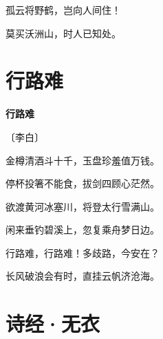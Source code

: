 \documentclass[12pt,UTF-8,openany,fontset=none]{ctexbook}
\begin{document}
    \vspace{18pt}

\begin{center}
    \begin{Large}

        孤云将野鹤，岂向人间住！

        莫买沃洲山，时人已知处。

    \end{Large}

\end{center}

\vspace{8pt}
\clearpage

\section{行路难}


\begin{center}
    {\bfseries 行路难}

    \vspace{18pt}

    \begin{large}\xuwen
        〔李白〕
    \end{large}

\end{center}

    \vspace{18pt}

\begin{center}
    \begin{Large}

        金樽清酒斗十千，玉盘珍羞值万钱。

        停杯投箸不能食，拔剑四顾心茫然。

        欲渡黄河冰塞川，将登太行雪满山。

        闲来垂钓碧溪上，忽复乘舟梦日边。

        行路难，行路难！多歧路，今安在？

        长风破浪会有时，直挂云帆济沧海。

    \end{Large}

\end{center}

\vspace{8pt}
\clearpage

\section{诗经·无衣}
\end{document}
